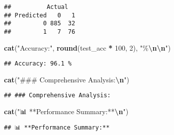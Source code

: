 \documentclass[
]{article}
\newenvironment{Shaded}{\begin{snugshade}}{\end{snugshade}}
\newcommand{\AttributeTok}[1]{\textcolor[rgb]{0.13,0.29,0.53}{#1}}
\newcommand{\DecValTok}[1]{\textcolor[rgb]{0.00,0.00,0.81}{#1}}
\newcommand{\FunctionTok}[1]{\textcolor[rgb]{0.13,0.29,0.53}{\textbf{#1}}}
\newcommand{\NormalTok}[1]{#1}
\newcommand{\OtherTok}[1]{\textcolor[rgb]{0.56,0.35,0.01}{#1}}
\newcommand{\SpecialCharTok}[1]{\textcolor[rgb]{0.81,0.36,0.00}{\textbf{#1}}}
\newcommand{\StringTok}[1]{\textcolor[rgb]{0.31,0.60,0.02}{#1}}
\begin{document}
\begin{Shaded}
\end{Shaded}

\begin{verbatim}
##          Actual
## Predicted   0   1
##         0 885  32
##         1   7  76
\end{verbatim}

\begin{Shaded}
\begin{Highlighting}[]
\FunctionTok{cat}\NormalTok{(}\StringTok{"Accuracy:"}\NormalTok{, }\FunctionTok{round}\NormalTok{(test\_acc }\SpecialCharTok{*} \DecValTok{100}\NormalTok{, }\DecValTok{2}\NormalTok{), }\StringTok{"\%}\SpecialCharTok{\textbackslash{}n\textbackslash{}n}\StringTok{"}\NormalTok{)}
\end{Highlighting}
\end{Shaded}

\begin{verbatim}
## Accuracy: 96.1 %
\end{verbatim}

\begin{Shaded}
\begin{Highlighting}[]
\FunctionTok{cat}\NormalTok{(}\StringTok{"\#\#\# Comprehensive Analysis:}\SpecialCharTok{\textbackslash{}n}\StringTok{"}\NormalTok{)}
\end{Highlighting}
\end{Shaded}

\begin{verbatim}
## ### Comprehensive Analysis:
\end{verbatim}

\begin{Shaded}
\begin{Highlighting}[]
\FunctionTok{cat}\NormalTok{(}\StringTok{"📊 **Performance Summary:**}\SpecialCharTok{\textbackslash{}n}\StringTok{"}\NormalTok{)}
\end{Highlighting}
\end{Shaded}

\begin{verbatim}
## 📊 **Performance Summary:**
\end{verbatim}
\end{document}
